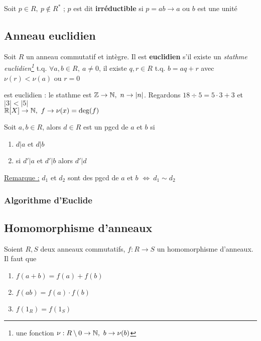\documentclass[12pt,a4paper]{article}
\begin{document}
\begin{boite}
     Soit $p \in R,\ p \notin R^*$ ; $p$ est dit \textbf{irréductible} si $p = ab \to a$ ou $b$ est une unité 
\end{boite}

\subsection{Anneau euclidien}
\begin{boite}
    Soit $R$ un anneau commutatif et intègre. Il est \textbf{euclidien} s'il existe un \textit{stathme euclidien\footnote{une fonction $\nu : R\setminus {0} \to \mathbb{N},\ b \to \nu(b)$}} t.q. $\forall a,b \in R,\ a \neq 0$, il existe $q,r \in R$ t.q. $b = aq + r$ avec $\nu(r) < \nu(a)$ ou $r = 0$
\end{boite}
\begin{exemple}
    \Z est euclidien : le stathme est $\Z \to \N,\ n \to |n|$. Regardons $18 \div 5 = 5\cdot 3 + 3$ et $|3| < |5|$\\
    $\mathbb{R}[X] \to \mathbb{N},\ f \to \nu(x) = \deg(f)$
\end{exemple}
\begin{boite}
     Soit $a,b \in R$, alors $d \in R$ est un pgcd de $a$ et $b$ si     
    \begin{multicols}{2}
        \begin{enumerate}
            \item $d|a$ et $d|b$
            \item si $d'|a$ et $d'|b$ alors $d'|d$
        \end{enumerate}
    \end{multicols}
\end{boite}
\uline{Remarque :} $d_1$ et $d_2$ sont des pgcd de $a$ et $b$ $\iff\ d_1 \sim d_2$
\subsubsection{Algorithme d'Euclide}


\subsection{Homomorphisme d'anneaux}
Soient $R,S$ deux anneaux commutatifs, $f : R \to S$ un homomorphisme d'anneaux. Il faut que 
\begin{enumerate}
    \item $f(a+b) = f(a) + f(b)$
    \item $f(ab) = f(a)\cdot f(b)$
    \item $f(1_R) = f(1_S)$
\end{enumerate}
\end{document}
